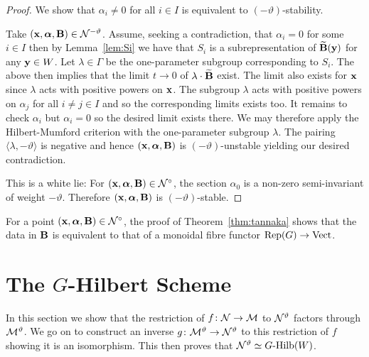 \documentclass{amsart}
\newcommand{\balpha}{\boldsymbol{\alpha}}
\theoremstyle{definition}
\begin{document}
\begin{proof}
We show that $\alpha_i \neq 0$ for all $i \in I$ is equivalent to $(-\vartheta)$-stability.

Take $(\bfx, \balpha, \bfB) \in \cN^{-\vartheta}$. 
Assume, seeking a contradiction, that $\alpha_i =0$ for some $i \in I$ then by Lemma~\ref{lem:Si} we have that $S_i$ is a subrepresentation of $\widetilde{\mathbf{B}}(\mathbf{y})$ for any $\mathbf{y} \in W$.
Let $\lambda \in \Gamma$ be the one-parameter subgroup corresponding to $S_i$.
The above then implies that the limit $t \rightarrow 0$ of $\lambda \cdot \widetilde{\mathbf{B}}$ exist.
The limit also exists for $\mathbf{x}$ since $\lambda$ acts with positive powers on $\mathbf{x}$.
The subgroup $\lambda$ acts with positive powers on $\alpha_j$ for all $i\neq j\in I$ and so the corresponding limits exists too.
It remains to check $\alpha_i$ but $\alpha_i=0$ so the desired limit exists there.
We may therefore apply the Hilbert-Mumford criterion with the one-parameter subgroup $\lambda$.
The pairing $\langle \lambda, -\vartheta \rangle$ is negative and hence $(\bfx, \balpha, \bfB)$ is $(-\vartheta)$-unstable yielding our desired contradiction.

{\red This is a white lie:}
For $(\bfx, \balpha, \bfB) \in \cN^\circ$, the section $\alpha_0$ is a non-zero semi-invariant of weight $-\vartheta$.
Therefore $(\bfx, \balpha, \bfB)$ is $(-\vartheta)$-stable.
\end{proof}

\begin{remark}
For a point $(\bfx, \balpha, \bfB) \in \cN^\circ$, the proof of Theorem~\ref{thm:tannaka} shows that the data in $\mathbf{B}$ is equivalent to that of a monoidal fibre functor $\operatorname{Rep}(G) \rightarrow \operatorname{Vect}$.
\end{remark}

\section{The $G$-Hilbert Scheme}
In this section we show that the restriction of $f \colon \mathcal{N} \rightarrow \mathcal{M}$ to $\mathcal{N}^\vartheta$ factors through $\mathcal{M}^\vartheta$.
We go on to construct an inverse $g \colon \mathcal{M}^\vartheta \rightarrow \mathcal{N}^\vartheta$ to this restriction of $f$ showing it is an isomorphism.
This then proves that $\mathcal{N}^\vartheta \simeq G\text{-Hilb}(W)$.
\end{document}
